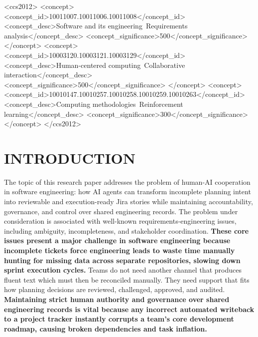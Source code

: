 \documentclass[manuscript,review]{acmart}
\begin{document}
\begin{CCSXML}
<ccs2012>
 <concept>
  <concept_id>10011007.10011006.10011008</concept_id>
  <concept_desc>Software and its engineering~Requirements analysis</concept_desc>
  <concept_significance>500</concept_significance>
 </concept>
 <concept>
  <concept_id>10003120.10003121.10003129</concept_id>
  <concept_desc>Human-centered computing~Collaborative interaction</concept_desc>
  <concept_significance>500</concept_significance>
 </concept>
 <concept>
  <concept_id>10010147.10010257.10010258.10010259.10010263</concept_id>
  <concept_desc>Computing methodologies~Reinforcement learning</concept_desc>
  <concept_significance>300</concept_significance>
 </concept>
</ccs2012>
\end{CCSXML}



\maketitle



\section{INTRODUCTION}
The topic of this research paper addresses the problem of human-AI cooperation in software engineering: how AI agents can transform incomplete planning intent into reviewable and execution-ready Jira stories while maintaining accountability, governance, and control over shared engineering records. The problem under consideration is associated with well-known requirements-engineering issues, including ambiguity, incompleteness, and stakeholder coordination. \textbf{These core issues present a major challenge in software engineering because incomplete tickets force engineering leads to waste time manually hunting for missing data across separate repositories, slowing down sprint execution cycles.} Teams do not need another channel that produces fluent text which must then be reconciled manually. They need support that fits how planning decisions are reviewed, challenged, approved, and audited. \textbf{Maintaining strict human authority and governance over shared engineering records is vital because any incorrect automated writeback to a project tracker instantly corrupts a team's core development roadmap, causing broken dependencies and task inflation.}
\end{document}
